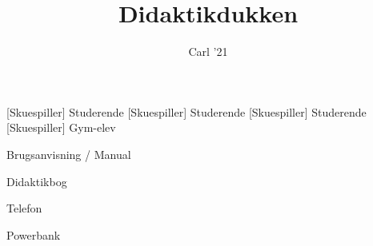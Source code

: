 \documentclass[a4paper,11pt]{article}
\title{Didaktikdukken}
\author{Carl '21}
\begin{document}
\maketitle

\begin{roles}
[Skuespiller] Studerende
[Skuespiller] Studerende
[Skuespiller] Studerende
[Skuespiller] Gym-elev
\end{roles}

\begin{props}
\item Brugsanvisning / Manual
\item Didaktikbog
\item Telefon
\item Powerbank
\end{props}
\end{document}
